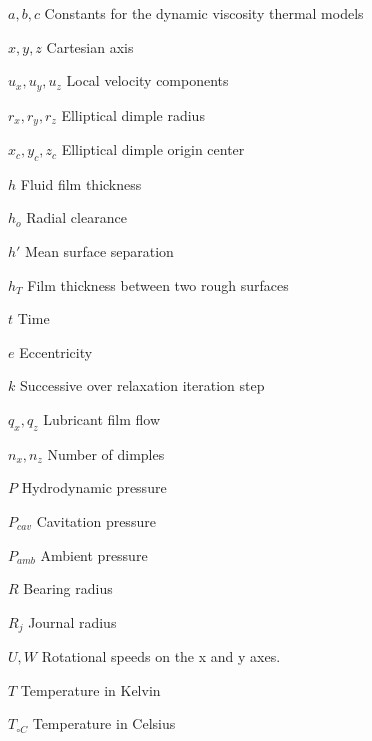 \listoffigures*
\cleardoublepage
%
\listoftables*
\cleardoublepage




\begin{simbolos}
	\item[$ a, b, c $] Constants for the dynamic viscosity thermal models
	\item[$ x, y, z $] Cartesian axis
	\item[$ u_x, u_y, u_z $] Local velocity components
	\item[$ r_x, r_y, r_z $] Elliptical dimple radius
	\item[$ x_c, y_c, z_c $] Elliptical dimple origin center
	\item[$ h $] Fluid film thickness
	\item[$ h_o $] Radial clearance
	\item[$ h' $] Mean surface separation
	\item[$ h_T $] Film thickness between two rough surfaces
	\item[$ t $] Time
	\item[$ e $] Eccentricity
	\item[$ k $] Successive over relaxation iteration step		
	\item[$ q_x, q_z $] Lubricant film flow	
	\item[$ n_x, n_z $] Number of dimples
	\item[$ P $] Hydrodynamic pressure
	\item[$ P_{cav} $] Cavitation pressure
	\item[$ P_{amb} $] Ambient pressure	
	\item[$ R $] Bearing radius
	\item[$ R_j $] Journal radius
	\item[$ U, W $] Rotational speeds on the x and y axes.
	\item[$ T $] Temperature in Kelvin
	\item[$ T_{\circ C} $] Temperature in Celsius

\end{simbolos}
